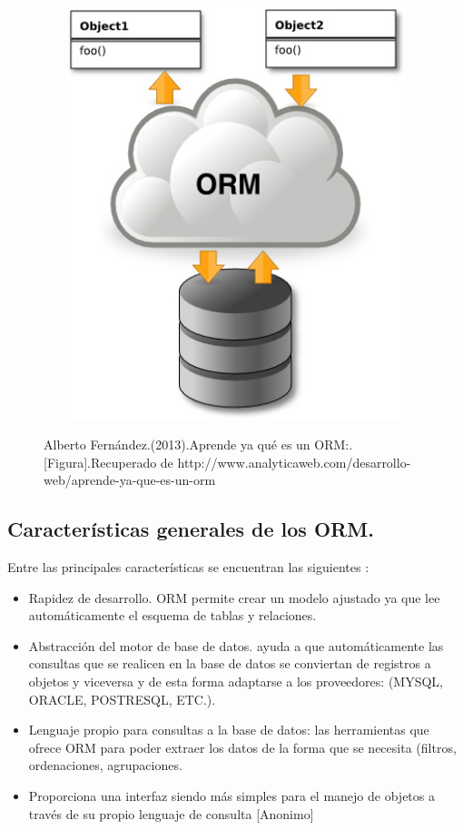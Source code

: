 \documentclass[preprint,12pt]{elsarticle}
\begin{document}
\begin{figure}[H]
				\begin{center}
					\includegraphics[width=12cm,height=12cm]{./IMAGENES/orm}
				\end{center}
Alberto Fernández.(2013).Aprende ya qué es un ORM:.[Figura].Recuperado de 
http://www.analyticaweb.com/desarrollo-web/aprende-ya-que-es-un-orm

			\end{figure}



\subsection{Características generales de los ORM. }
Entre las principales características se
encuentran las siguientes \citep {referencia05}:	
\begin{itemize}
\item Rapidez de desarrollo. ORM permite crear un modelo ajustado ya que lee
automáticamente el esquema de tablas y relaciones.
\item Abstracción del motor de base de datos. ayuda a que automáticamente las
consultas que se realicen en la base de datos se conviertan de registros a
objetos y viceversa y de esta forma adaptarse a los proveedores: (MYSQL,
ORACLE, POSTRESQL, ETC.). 
\item Lenguaje propio para consultas a la base de datos: las herramientas que
ofrece ORM para poder extraer los datos de la forma que se necesita (filtros,
ordenaciones, agrupaciones.
\item Proporciona una interfaz siendo más simples para el manejo de objetos a
través de su propio lenguaje de consulta [Anonimo]
\end{itemize}
\end{document}
